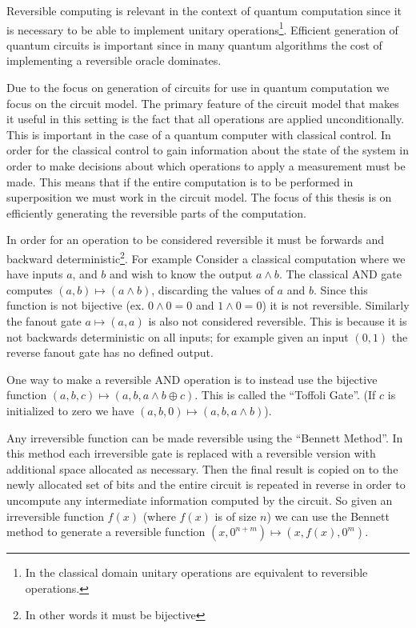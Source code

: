 Reversible computing is relevant in the context of quantum computation since it
is necessary to be able to implement unitary operations\footnote{In the
classical domain unitary operations are equivalent to reversible operations.}.
Efficient generation of quantum circuits is important since in many quantum
algorithms the cost of implementing a reversible oracle dominates.

Due to the focus on generation of circuits for use in quantum computation we
focus on the circuit model. The primary feature of the circuit model that makes
it useful in this setting is the fact that all operations are applied
unconditionally. This is important in the case of a quantum computer with
classical control. In order for the classical control to gain information about
the state of the system in order to make decisions about which operations to
apply a measurement must be made. This means that if the entire computation is
to be performed in superposition we must work in the circuit model. The focus
of this thesis is on efficiently generating the reversible parts of the
computation.  

In order for an operation to be considered reversible it must be forwards and
backward deterministic\footnote{In other words it must be bijective}. For example 
Consider a classical computation where we have inputs $a$, and $b$ and wish to
know the output $a\land b$. The classical AND gate computes $(a,b)\mapsto
(a\land b)$, discarding the values of $a$ and $b$. Since this function is not
bijective (ex. $0\land 0 = 0$ and $1 \land 0 = 0$) it is not reversible.
Similarly the fanout gate $a\mapsto (a,a)$ is also not considered reversible.
This is because it is not backwards deterministic on all inputs; for example
given an input $(0,1)$ the reverse fanout gate has no defined output. 

One way to make a reversible AND operation
is to instead use the bijective function $(a,b,c) \mapsto (a,b,a\land b \oplus
c)$. This is called the ``Toffoli Gate''.  (If $c$ is initialized to zero we
have $(a,b,0) \mapsto (a,b,a\land b)$).

Any irreversible function can be made reversible using the ``Bennett
Method''\cite{Bennett:73}. In this method each irreversible gate is replaced
with a reversible version with additional space allocated as necessary. Then
the final result is copied on to the newly allocated set of bits and the entire
circuit is repeated in reverse in order to uncompute any intermediate
information computed by the circuit. So given an irreversible
function $f(x)$ (where $f(x)$ is of size $n$) we can use the Bennett method to
generate a reversible function $(x,0^{n+m}) \mapsto (x,f(x),0^m)$.

